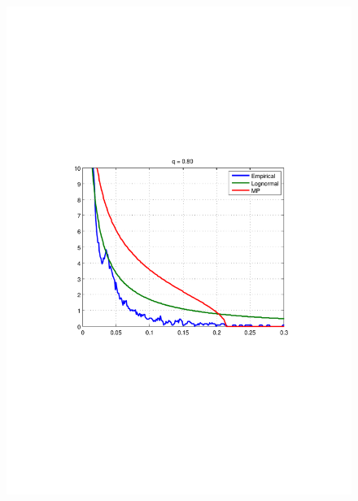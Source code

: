 \documentclass{article}
\begin{document}
\begin{figure}[htb!]
{    \includegraphics[scale=0.33, clip=true, trim=115 271 109
    204]{../pics/spectral_density_q0dot8.pdf}
  }
  \subfigure[q = 0.95, v=0.8859, KL=0.15]{
}
\end{figure}
\end{document}

